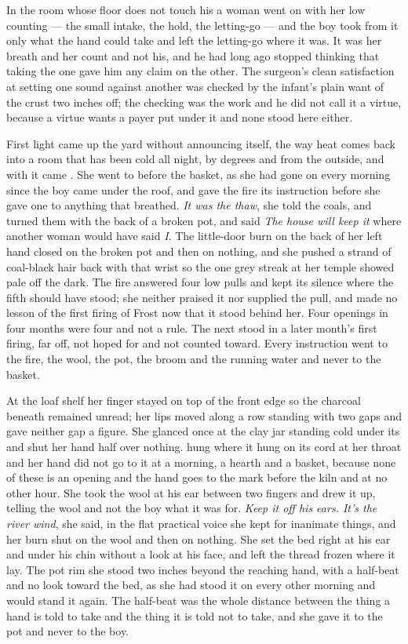 In the room whose floor does not touch his a woman went on with her low counting --- the small intake, the hold, the letting-go --- and the boy took from it only what the hand could take and left the letting-go where it was. It was her breath and her count and not his, and he had long ago stopped thinking that taking the one gave him any claim on the other. The surgeon's clean satisfaction at setting one sound against another was checked by the infant's plain want of the crust two inches off; the checking was the work and he did not call it a virtue, because a virtue wants a payer put under it and none stood here either.

First light came up the yard without announcing itself, the way heat comes back into a room that has been cold all night, by degrees and from the outside, and with it came . She went to  before the basket, as she had gone on every morning since the boy came under the roof, and gave the fire its instruction before she gave one to anything that breathed. \emph{It was the thaw}, she told the coals, and turned them with the back of a broken pot, and said \emph{The house will keep it} where another woman would have said \emph{I}. The little-door burn on the back of her left hand closed on the broken pot and then on nothing, and she pushed a strand of coal-black hair back with that wrist so the one grey streak at her temple showed pale off the dark. The fire answered four low pulls and kept its silence where the fifth should have stood; she neither praised it nor supplied the pull, and made no lesson of the first firing of Frost now that it stood behind her. Four openings in four months were four and not a rule. The next stood in a later month's first firing, far off, not hoped for and not counted toward. Every instruction went to the fire, the wool, the pot, the broom and the running water and never to the basket.

At the loaf shelf her finger stayed on top of the front edge so the charcoal beneath remained unread; her lips moved along a row standing with two gaps and gave neither gap a figure. She glanced once at the clay jar standing cold under its  and shut her hand half over nothing.  hung where it hung on its cord at her throat and her hand did not go to it at a morning, a hearth and a basket, because none of these is an opening and the hand goes to the mark before the kiln and at no other hour. She took the wool at his ear between two fingers and drew it up, telling the wool and not the boy what it was for. \emph{Keep it off his ears. It's the river wind}, she said, in the flat practical voice she kept for inanimate things, and her burn shut on the wool and then on nothing. She set the bed right at his ear and under his chin without a look at his face, and left the thread frozen where it lay. The pot rim she stood two inches beyond the reaching hand, with a half-beat and no look toward the bed, as she had stood it on every other morning and would stand it again. The half-beat was the whole distance between the thing a hand is told to take and the thing it is told not to take, and she gave it to the pot and never to the boy.

